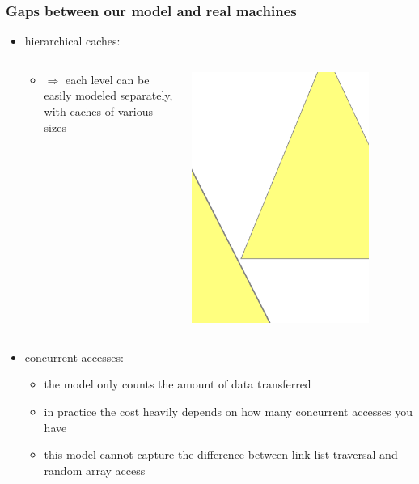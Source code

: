 \documentclass[12pt,dvipdfmx]{beamer}
\newcommand{\ao}[1]{{\color{blue}#1}}
\begin{document}
\begin{frame}
\frametitle{Gaps between our model and real machines}
\begin{itemize}
\item<1-> \ao{hierarchical caches:}
\begin{columns}
  \begin{column}{0.6\textwidth}
    \begin{itemize}
    \item []
      $\Rightarrow$ each level can be easily modeled separately, with
      caches of various sizes
    \end{itemize}
  \end{column}
  \begin{column}{0.35\textwidth}
    \includegraphics[width=0.8\textwidth]{out/pdf/svg/analysis_motivation_2.pdf}
  \end{column}
\end{columns}

\item<2-> \ao{concurrent accesses:}
  \begin{itemize}
  \item the model only counts the amount of data transferred
  \item in practice the cost heavily depends on how
    many concurrent accesses you have
  \item this model cannot capture the difference
    between link list traversal and random 
    array access
  \end{itemize}


\end{itemize}
\end{frame}
\end{document}
